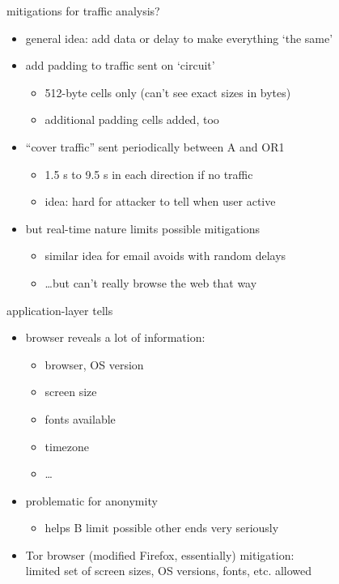\begin{frame}{mitigations for traffic analysis?}
    \begin{itemize}
    \item general idea: add data or delay to make everything `the same'
    \item add padding to traffic sent on `circuit'
        \begin{itemize}
        \item 512-byte cells only (can't see exact sizes in bytes)
        \item additional padding cells added, too
        \end{itemize}
    \item ``cover traffic'' sent periodically between A and OR1
        \begin{itemize}
        \item 1.5 s to 9.5 s in each direction if no traffic
        \item idea: hard for attacker to tell when user active
        \end{itemize}
    \item but real-time nature limits possible mitigations
        \begin{itemize}
        \item similar idea for email avoids with random delays
        \item \ldots but can't really browse the web that way
        \end{itemize}
    \end{itemize}
\end{frame}

\begin{frame}{application-layer tells}
    \begin{itemize}
    \item browser reveals a lot of information:
        \begin{itemize}
        \item browser, OS version
        \item screen size
        \item fonts available
        \item timezone
        \item \ldots
        \end{itemize}
    \item problematic for anonymity
        \begin{itemize}
        \item helps B limit possible other ends very seriously
        \end{itemize}
    \vspace{.5cm}
    \item Tor browser (modified Firefox, essentially) mitigation: \\
        limited set of screen sizes, OS versions, fonts, etc. allowed
    \end{itemize}
\end{frame}

